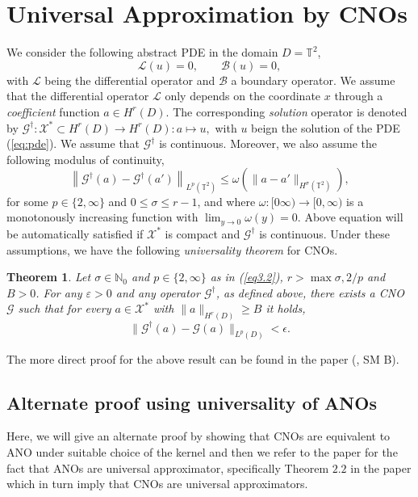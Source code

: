 \documentclass[reqno,10pt]{amsart}
\theoremstyle{plain}
\newtheorem{thm}{Theorem}
\theoremstyle{definition}
\newcommand{\bb}[1]{\mathbb{#1}}
\newcommand{\cal}[1]{\mathcal{#1}}
\begin{document}
    \section{Universal Approximation by CNOs}
    \noindent We consider the following abstract PDE in the domain $D = \bb T^2$,
    \begin{equation}\label{eq:pde}
        \cal L(u) = 0, \qquad \cal B(u) = 0,
    \end{equation}
    with $\cal L$ being the differential operator and $\cal B$ a boundary operator. We assume that the differential operator $\cal L$ only depends on the coordinate $x$ through a {\it coefficient} function $a \in H^r(D).$ The corresponding {\it solution} operator is denoted by $\cal G^\dag : \cal X^* \subset H^r(D) \to H^r(D) : a \mapsto u,$ with $u$ beign the solution of the PDE (\ref{eq:pde}). We assume that $\cal G^\dag$ is continuous. Moreover, we also assume the following modulus of continuity,
    \begin{equation}\label{eq3.2}
        \left\|\cal G^\dag(a) - \cal G^\dag(a')\right\|_{L^p(\bb T^2)} \leq \omega\left(\|a - a'\|_{H^\sigma(\bb T^2)}\right),
    \end{equation}
    for some $p \in \{2,\infty\}$ and $0 \leq \sigma \leq r-1$, and where $\omega : [0\infty) \to [0,\infty)$ is a monotonously increasing function with $\lim_{y \to 0} \omega (y) = 0$. Above equation will be automatically satisfied if $\cal X^*$ is compact and $\cal G^\dag$ is continuous. Under these assumptions, we have the following {\it universality theorem} for CNOs.

    \begin{thm}
        Let $\sigma \in \bb N_0$ and $p \in \{2,\infty\}$ as in (\ref{eq3.2}), $r > \max{\sigma, 2/p}$ and $B > 0$. For any $\varepsilon > 0$ and any operator $\cal G^\dag$, as defined above, there exists a CNO $\cal G$ such that for every $a \in \cal X^*$ with $\|a\|_{H^r(D)} \geq B$ it holds,
        \begin{equation}
            \|\cal G^\dag(a) - \cal G(a)\|_{L^p(D)} < \epsilon.
        \end{equation}
    \end{thm}
    \noindent The more direct proof for the above result can be found in the paper (\cite{BR2023}, SM B).
    
    \subsection{Alternate proof using universality of ANOs}
    Here, we will give an alternate proof by showing that CNOs are equivalent to ANO under suitable choice of the kernel and then we refer to the paper \cite{SL2024} for the fact that ANOs are universal approximator, specifically Theorem $2.2$ in the paper \cite{SL2024} which in turn imply that CNOs are universal approximators.
\end{document}
